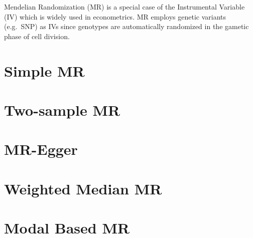 \documentclass[]{book}
\theoremstyle{definition}
\theoremstyle{definition}
\theoremstyle{definition}
\theoremstyle{remark}
\begin{document}
Mendelian Randomization (MR) is a special case of the Instrumental
Variable (IV) which is widely used in econometrics. MR employs genetic
variants (e.g.~SNP) as IVs since genotypes are automatically randomized
in the gametic phase of cell division.

\section{Simple MR}\label{simple-mr}

\section{Two-sample MR}\label{two-sample-mr}

\section{MR-Egger}\label{mr-egger}

\section{Weighted Median MR}\label{weighted-median-mr}

\section{Modal Based MR}\label{modal-based-mr}


\end{document}

